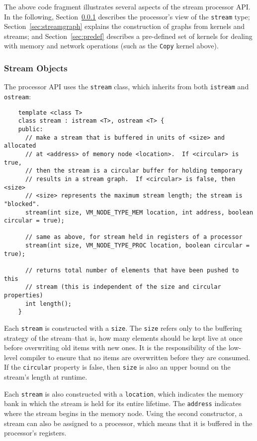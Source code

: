 The above code fragment illustrates several aspects of the stream
processor API.  In the following, Section~\ref{sec:procstreams}
describes the processor's view of the {\tt stream} type;
Section~\ref{sec:streamgraph} explains the construction of graphs from
kernels and streams; and Section~\ref{sec:predef} describes a
pre-defined set of kernels for dealing with memory and network
operations (such as the {\tt Copy} kernel above).

\subsubsection{Stream Objects}
\label{sec:procstreams}

The processor API uses the {\tt stream} class, which inherits from
both {\tt istream} and {\tt ostream}:
{\small
\begin{verbatim}
    template <class T> 
    class stream : istream <T>, ostream <T> {
    public:
      // make a stream that is buffered in units of <size> and allocated
      // at <address> of memory node <location>.  If <circular> is true,
      // then the stream is a circular buffer for holding temporary
      // results in a stream graph.  If <circular> is false, then <size>
      // <size> represents the maximum stream length; the stream is "blocked".
      stream(int size, VM_NODE_TYPE_MEM location, int address, boolean circular = true);

      // same as above, for stream held in registers of a processor
      stream(int size, VM_NODE_TYPE_PROC location, boolean circular = true);

      // returns total number of elements that have been pushed to this
      // stream (this is independent of the size and circular properties)
      int length();
    }  
\end{verbatim}}

Each {\tt stream} is constructed with a {\tt size}.  The {\tt size}
refers only to the buffering strategy of the stream--that is, how many
elements should be kept live at once before overwriting old items with
new ones.  It is the responsibility of the low-level compiler to
ensure that no items are overwritten before they are consumed.  If the
{\tt circular} property is false, then {\tt size} is also an upper
bound on the stream's length at runtime.

Each {\tt stream} is also constructed with a {\tt location}, which
indicates the memory bank in which the stream is held for its entire
lifetime.  The {\tt address} indicates where the stream begins in the
memory node.  Using the second constructor, a stream can also be
assigned to a processor, which means that it is buffered in the
processor's registers.

